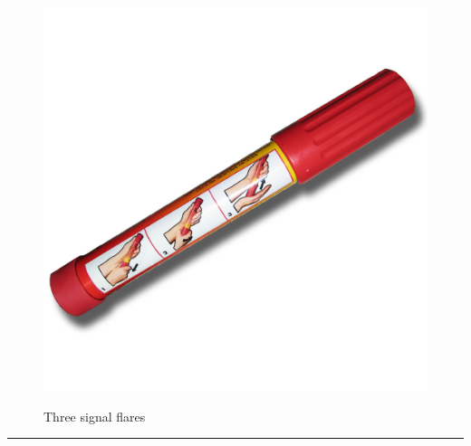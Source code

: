 \documentclass{article}
\begin{document}
    \begin{figure}[H]
        \centering
        \begin{minipage}{0.25\textwidth}
            \centering
            \includegraphics[width=\textwidth]{../SurvivalItemImages/flares}
        \end{minipage}\hfill
        \begin{minipage}{0.7\textwidth}
            \centering
            \Large Three signal flares
        \end{minipage}
    \end{figure}
    \vspace{-0.8em}
    \noindent\rule{\textwidth}{0.4pt}
            
    \clearpage
\end{document}
